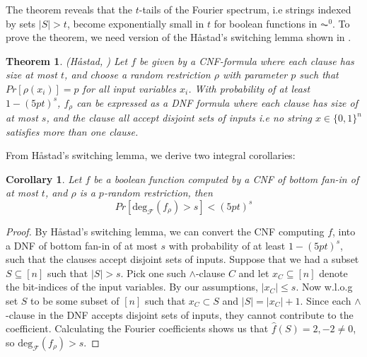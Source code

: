 \documentclass{amsart}
\newtheorem{theorem}{Theorem}[section]
\newtheorem{corollary}{Corollary}[theorem]
\theoremstyle{definition}
\theoremstyle{remark}
\numberwithin{equation}{section}
\theoremstyle{remark}
\begin{document}
\noindent The theorem reveals that the $t$-tails of the Fourier spectrum, i.e strings indexed by sets $|S| > t$, become exponentially small in $t$ for boolean functions in $\AC^0$. To prove the theorem, we need version of the H\aa stad's switching lemma shown in \cite{hastad}.
%
\begin{theorem}{(\emph{H\aa stad}, \cite{hastad})}
  Let $f$ be given by a CNF-formula where each clause has size at most $t$, and choose a random restriction $\rho$ with parameter $p$ such that $Pr[\rho(x_i)] = p$ for all input variables $x_i$. With probability of at least $1 - (5pt)^s$, $f_{\rho}$ can be expressed as a DNF formula where each clause has size of at most $s$, and the clause all accept disjoint sets of inputs i.e no string $x \in \{0,1\}^n$ satisfies more than one clause.
\end{theorem}
\noindent From H\aa stad's switching lemma, we derive two integral corollaries:
%
\begin{corollary} \label{hastaddegree}
Let $f$ be a boolean function computed by a CNF of bottom fan-in of at most $t$, and $\rho$ is a $p$-random restriction, then
\begin{equation}
  Pr[\text{deg}_{\mathcal{F}}(f_\rho) > s] < (5pt)^s
\end{equation}
\end{corollary}
%
\begin{proof}
  By H\aa stad's switching lemma, we can convert the CNF computing $f$, into a DNF of bottom fan-in of at most $s$ with probability of at least $1 - (5pt)^s$, such that the clauses accept disjoint sets of inputs. Suppose that we had a subset $S \subseteq [n]$ such that $|S| > s$. Pick one such $\wedge$-clause $C$ and let $x_{C} \subseteq [n]$ denote the bit-indices of the input variables. By our assumptions, $|x_C| \leq s$. Now w.l.o.g set $S$ to be some subset of $[n]$ such that $x_C \subset S$ and $|S| = |x_C| + 1$. Since each $\wedge$-clause in the DNF accepts disjoint sets of inputs, they cannot contribute to the coefficient.  Calculating the Fourier coefficients shows us that $\hat{f}(S) = 2,-2 \neq 0$, so $\text{deg}_{\mathcal{F}}(f_\rho) > s$.
\end{proof}
\end{document}
